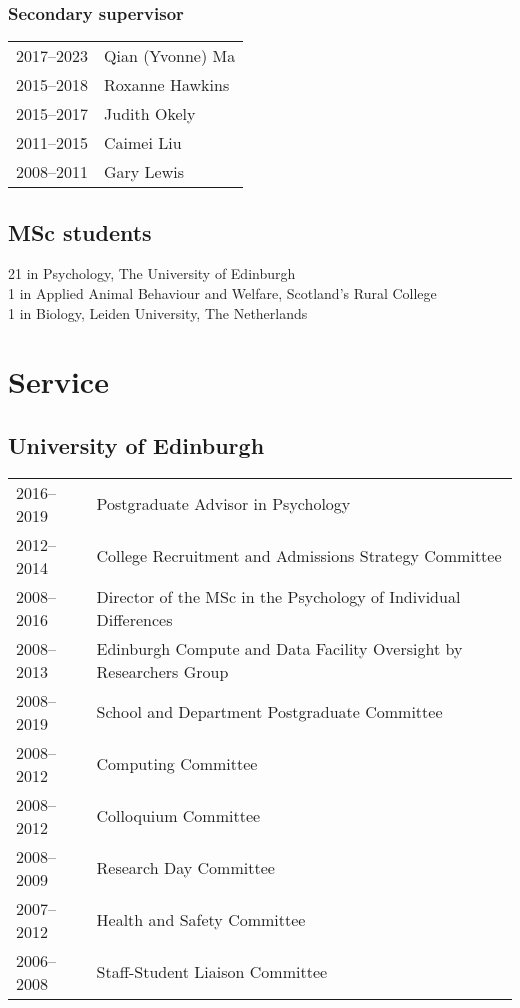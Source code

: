 \documentclass[11pt]{article}
\begin{document}
\subsubsection*{Secondary supervisor}

\begin{tabular}{p{3cm}p{12cm}}
2017--2023 & Qian (Yvonne) Ma \\
2015--2018 & Roxanne Hawkins \\
2015--2017 & Judith Okely \\
2011--2015 & Caimei Liu \\
2008--2011 & Gary Lewis
\end{tabular}

\subsection*{MSc students}
21 in Psychology, The University of Edinburgh \\
1 in Applied Animal Behaviour and Welfare, Scotland's Rural College \\
1 in Biology, Leiden University, The Netherlands

\section*{Service}
\subsection*{University of Edinburgh}

\begin{tabular}{p{3cm}p{12cm}}
2016--2019 & Postgraduate Advisor in Psychology \\
2012--2014 & College Recruitment and Admissions Strategy Committee \\
2008--2016 & Director of the MSc in the Psychology of Individual
Differences \\
2008--2013 & Edinburgh Compute and Data Facility Oversight by
Researchers Group \\
2008--2019 & School and Department Postgraduate Committee \\
2008--2012 & Computing Committee \\
2008--2012 & Colloquium Committee \\
2008--2009 & Research Day Committee \\
2007--2012 & Health and Safety Committee \\
2006--2008 & Staff-Student Liaison Committee
\end{tabular}
\end{document}
